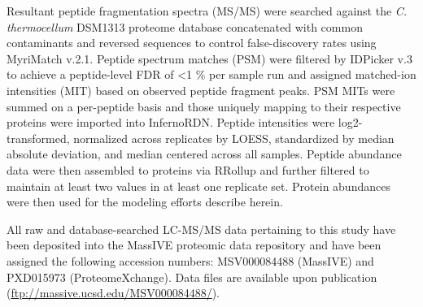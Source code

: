 Resultant peptide fragmentation spectra (MS/MS) were searched against the \textit{C. thermocellum} DSM1313 proteome database concatenated with common contaminants and reversed sequences to control false-discovery rates using MyriMatch v.2.1.\citep{tabb2007}
Peptide spectrum matches (PSM) were filtered by IDPicker v.3\citep{ma2009} to achieve a peptide-level FDR of \textless1 \% per sample run and assigned matched-ion intensities (MIT) based on observed peptide fragment peaks.
PSM MITs were summed on a per-peptide basis and those uniquely mapping to their respective proteins were imported into InfernoRDN.\citep{taverner2012}
Peptide intensities were log2-transformed, normalized across replicates by LOESS, standardized by median absolute deviation, and median centered across all samples. Peptide abundance data were then assembled to proteins via RRollup and further filtered to maintain at least two values in at least one replicate set. Protein abundances were then used for the modeling efforts describe herein.

All raw and database-searched LC-MS/MS data pertaining to this study have been deposited into the MassIVE proteomic data repository and have been assigned the following accession numbers: MSV000084488 (MassIVE) and PXD015973 (ProteomeXchange). Data files are available upon publication (\url{ftp://massive.ucsd.edu/MSV000084488/}).


%
%

%






